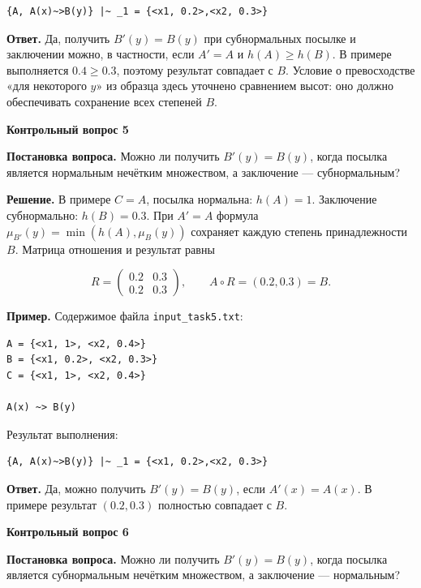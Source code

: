 \documentclass[14pt,a4paper]{extarticle}
\newcommand{\reportheading}[1]{\par\vspace{0.8\baselineskip}\noindent\textbf{#1}\par\nobreak\vspace{0.35\baselineskip}\nobreak}
\begin{document}
\begin{Verbatim}[fontsize=\small,baselinestretch=1,frame=single,breaklines=true]
{A, A(x)~>B(y)} |~ _1 = {<x1, 0.2>,<x2, 0.3>}
\end{Verbatim}

\smallskip\noindent\textbf{Ответ.} Да, получить $B'(y)=B(y)$ при субнормальных посылке и заключении можно, в частности, если $A'=A$ и $h(A)\geq h(B)$. В примере выполняется $0.4\geq0.3$, поэтому результат совпадает с $B$. Условие о превосходстве «для некоторого $y$» из образца здесь уточнено сравнением высот: оно должно обеспечивать сохранение всех степеней $B$.


\clearpage
\reportheading{Контрольный вопрос 5}

\noindent\textbf{Постановка вопроса.} Можно ли получить $B'(y)=B(y)$, когда посылка является нормальным нечётким множеством, а заключение --- субнормальным?

\smallskip\noindent\textbf{Решение.} В примере $C=A$, посылка нормальна: $h(A)=1$. Заключение субнормально: $h(B)=0.3$. При $A'=A$ формула $\mu_{B'}(y)=\min(h(A),\mu_B(y))$ сохраняет каждую степень принадлежности $B$. Матрица отношения и результат равны

\[
R=\begin{pmatrix}0.2&0.3\\0.2&0.3\end{pmatrix},\qquad A\circ R=(0.2,0.3)=B.
\]

\noindent\textbf{Пример.} Содержимое файла \texttt{input\_task5.txt}:

\begin{Verbatim}[fontsize=\small,baselinestretch=1,frame=single,breaklines=true]
A = {<x1, 1>, <x2, 0.4>}
B = {<x1, 0.2>, <x2, 0.3>}
C = {<x1, 1>, <x2, 0.4>}

A(x) ~> B(y)
\end{Verbatim}

\noindent Результат выполнения:

\begin{Verbatim}[fontsize=\small,baselinestretch=1,frame=single,breaklines=true]
{A, A(x)~>B(y)} |~ _1 = {<x1, 0.2>,<x2, 0.3>}
\end{Verbatim}

\smallskip\noindent\textbf{Ответ.} Да, можно получить $B'(y)=B(y)$, если $A'(x)=A(x)$. В примере результат $(0.2,0.3)$ полностью совпадает с $B$.


\clearpage
\reportheading{Контрольный вопрос 6}

\noindent\textbf{Постановка вопроса.} Можно ли получить $B'(y)=B(y)$, когда посылка является субнормальным нечётким множеством, а заключение --- нормальным?
\end{document}
